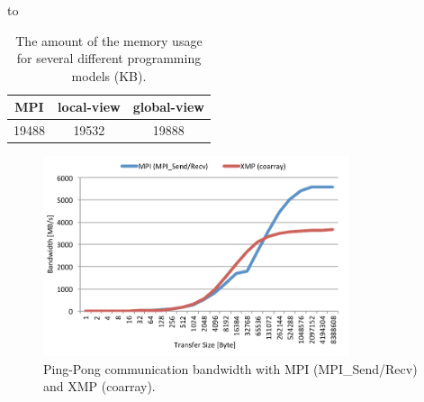\begin{table}[t] 
\caption{Machine Environment (HA-PACS Cluster)} 
{\scriptsize
\label{env}
\hbox to
}
\end{table}

\begin{table}[t]
\begin{center}
\caption{The amount of the memory usage for several different programming models (KB).\label{mem}}
{\footnotesize
\label{code}
\begin{tabular}{c|c|c} \hline\hline
 MPI & local-view & global-view \\ \hline
 19488 & 19532 & 19888 \\ \hline
\end{tabular}
}
\end{center}
\end{table}


\begin{figure}[t]
\begin{center}
\includegraphics[width=9cm, bb=0 0 390 254]{./figure/comm.pdf}
\caption{Ping-Pong communication bandwidth with MPI (MPI\_Send/Recv) and XMP (coarray).}
\label{comm}
\end{center}
\end{figure}


